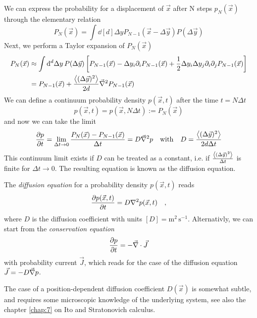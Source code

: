 \documentclass{notebook}
\begin{document}
We can express the probability for a displacement of $\vec{x}$ after N steps $p_N(\vec{x})$ through the elementary relation
%
\begin{equation}
P_N(\vec{x}) = \int{\dd[d]{\Delta y} P_{N-1}(\vec{x} - \Delta \vec{y}) P(\Delta \vec{y})}
\end{equation}
%
Next, we perform a Taylor expansion of $P_N(\vec{x})$
%
\begin{align*}
P_N(\vec{x}) &\approx \int{\dd[d]{\Delta y} P(\Delta \vec{y}) \left[ 
	P_{N-1}(\vec{x}) - \Delta y_i \partial_i P_{N-1}(\vec{x}) + \frac{1}{2}  \Delta y_i \Delta y_j \partial_i \partial_j P_{N-1}(\vec{x}) \right]} \\
&= P_{N-1}(\vec{x}) + \frac{\expval{(\Delta \vec{y})^2}}{2 d} \vec{\nabla}^2 P_{N-1}(\vec{x})	
\end{align*}
%
We can define a continuum probability density $p(\vec{x},t)$ after the time $t = N \Delta t$
%
\begin{equation}
p(\vec{x},t) = p(\vec{x}, N \Delta t) := P_N(\vec{x})
\end{equation}
%
and now we can take the limit
%
\begin{equation}
\pdv{p}{t} = \lim_{\Delta t \to 0} \frac{P_N(\vec{x}) - P_{N-1}(\vec{x})}{\Delta t} = D \vec{\nabla}^2 p \quad \mathrm{with} \quad D = \frac{\expval{(\Delta \vec{y})^2}}{2 d \Delta t}
\end{equation}
%
This continuum limit exists if $D$ can be treated as a constant, i.e. if $\frac{\expval{(\Delta \vec{y})^2}}{\Delta t}$ is finite for $\Delta t \to 0$. The resulting equation is known as the diffusion equation.

\newpage
%
\begin{theorem}
	The \textit{diffusion equation} for a probability density $p(\vec{x}, t)$ reads
	\begin{equation}
	\pdv{p(\vec{x}, t)}{t} = D \nabla^2 p(\vec{x}, t) \quad,
	\end{equation}
	where $D$ is the diffusion coefficient with units $[D]=\mathrm{m}^2\,\mathrm{s}^{-1}$.
	Alternativly, we can start from the \textit{conservation equation}
	\begin{equation}
	\pdv{p}{t} = - \vec{\nabla} \cdot \vec{J}
	\end{equation}
	with probability current $\vec{J}$, 
	which reads for the case of the diffusion equation $\vec{J} = -D \vec{\nabla} p$.
\end{theorem}
%

\begin{caveat}
	The case of a position-dependent diffusion coefficient $D(\vec{x})$ is somewhat subtle, 
	and requires some microscopic knowledge of the underlying system, see also the chapter \ref{chap:7} on Ito and Stratonovich calculus. 
\end{caveat}
\end{document}
